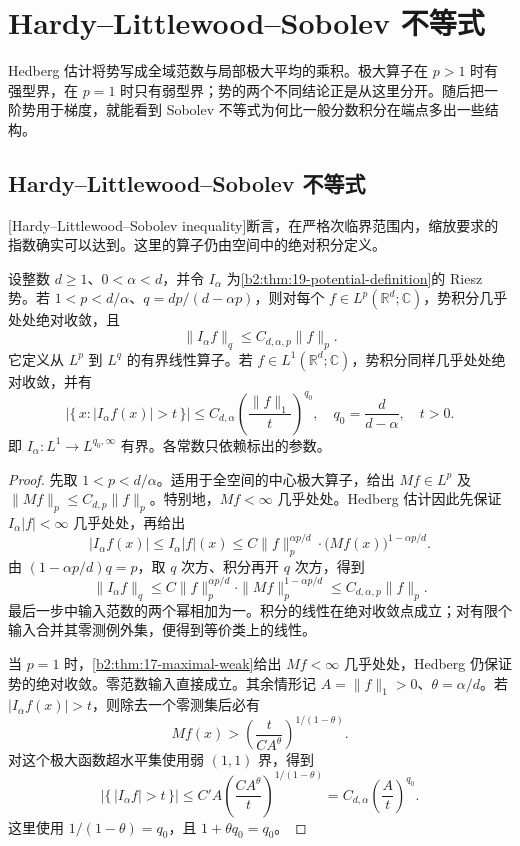 \section{Hardy–Littlewood–Sobolev 不等式}
\label{b2:sec:1902}

Hedberg 估计将势写成全域范数与局部极大平均的乘积。极大算子在 \(p>1\) 时有强型界，在 \(p=1\) 时只有弱型界；势的两个不同结论正是从这里分开。随后把一阶势用于梯度，就能看到 Sobolev 不等式为何比一般分数积分在端点多出一些结构。

\subsection{Hardy--Littlewood--Sobolev 不等式}
\label{b2:subsec:190201}

[Hardy--Littlewood--Sobolev inequality]断言，在严格次临界范围内，缩放要求的指数确实可以达到。这里的算子仍由空间中的绝对积分定义。
\begin{theorem}\label{b2:thm:19-hls}
设整数 \(d\geq1\)、\(0<\alpha<d\)，并令 \(I_\alpha\) 为\cref{b2:thm:19-potential-definition}的 Riesz 势。若 \(1<p<d/\alpha\)、\(q=dp/(d-\alpha p)\)，则对每个 \(f\in L^p(\mathbb R^d;\mathbb C)\)，势积分几乎处处绝对收敛，且
\[
 \|I_\alpha f\|_q\leq C_{d,\alpha,p}\|f\|_p.
\]
它定义从 \(L^p\) 到 \(L^q\) 的有界线性算子。若 \(f\in L^1(\mathbb R^d;\mathbb C)\)，势积分同样几乎处处绝对收敛，并有
\[
 \bigl|\{\,x:|I_\alpha f(x)|>t\,\}\bigr|
 \leq C_{d,\alpha}
       \left(\frac{\|f\|_1}{t}\right)^{q_0},
 \quad q_0=\frac d{d-\alpha},\quad t>0.
\]
即 \(I_\alpha:L^1\to L^{q_0,\infty}\) 有界。各常数只依赖标出的参数。
\end{theorem}
\begin{proof}
先取 \(1<p<d/\alpha\)。适用于全空间的中心极大算子，给出 \(Mf\in L^p\) 及 \(\|Mf\|_p\leq C_{d,p}\|f\|_p\)。特别地，\(Mf<\infty\) 几乎处处。Hedberg 估计因此先保证 \(I_\alpha|f|<\infty\) 几乎处处，再给出
\[
 |I_\alpha f(x)|\leq I_\alpha|f|(x)
 \leq C\|f\|_p^{\alpha p/d}\cdot
       \bigl(Mf(x)\bigr)^{1-\alpha p/d}.
\]
由 \((1-\alpha p/d)q=p\)，取 \(q\) 次方、积分再开 \(q\) 次方，得到
\[
 \|I_\alpha f\|_q
 \leq C\|f\|_p^{\alpha p/d}\cdot
       \|Mf\|_p^{1-\alpha p/d}
 \leq C_{d,\alpha,p}\|f\|_p.
\]
最后一步中输入范数的两个幂相加为一。积分的线性在绝对收敛点成立；对有限个输入合并其零测例外集，便得到等价类上的线性。

当 \(p=1\) 时，\cref{b2:thm:17-maximal-weak}给出 \(Mf<\infty\) 几乎处处，Hedberg 仍保证势的绝对收敛。零范数输入直接成立。其余情形记 \(A=\|f\|_1>0\)、\(\theta=\alpha/d\)。若 \(|I_\alpha f(x)|>t\)，则除去一个零测集后必有
\[
 Mf(x)>\left(\frac{t}{CA^\theta}\right)^{1/(1-\theta)}.
\]
对这个极大函数超水平集使用弱 \((1,1)\) 界，得到
\[
 \bigl|\{\,|I_\alpha f|>t\,\}\bigr|
 \leq C'A\left(\frac{CA^\theta}{t}\right)^{1/(1-\theta)}
 =C_{d,\alpha}\left(\frac At\right)^{q_0}.
\]
这里使用 \(1/(1-\theta)=q_0\)，且 \(1+\theta q_0=q_0\)。
\end{proof}
